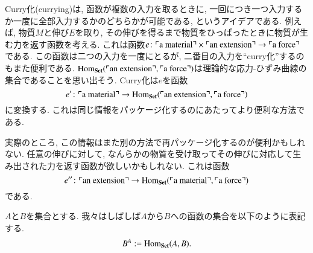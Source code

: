 
Curry化(currying)は, 函数が複数の入力を取るときに, 一回につき一つ入力するか一度に全部入力するかのどちらかが可能である, というアイデアである. 例えば, 物質$M$と伸び$E$を取り, その伸びを得るまで物質をひっぱったときに物質が生む力を返す函数を考える. これは函数$e\colon \textrm{$\ulcorner$a material$\urcorner$}\times\textrm{$\ulcorner$an extension$\urcorner$}\rightarrow\textrm{$\ulcorner$a force$\urcorner$}$である. この函数は二つの入力を一度にとるが, 二番目の入力を``curry化''するのもまた便利である. $\textrm{Hom}_{\bf Set}(\textrm{$\ulcorner$an extension$\urcorner$},\textrm{$\ulcorner$a force$\urcorner$})$は理論的な応力-ひずみ曲線の集合であることを思い出そう. Curry化は$e$を函数$$e'\colon\textrm{$\ulcorner$a material$\urcorner$}\rightarrow\textrm{Hom}_{\bf Set}(\textrm{$\ulcorner$an extension$\urcorner$},\textrm{$\ulcorner$a force$\urcorner$})$$に変換する. これは同じ情報をパッケージ化するのにあたってより便利な方法である.


実際のところ, この情報はまた別の方法で再パッケージ化するのが便利かもしれない. 任意の伸びに対して, なんらかの物質を受け取ってその伸びに対応して生み出された力を返す函数が欲しいかもしれない. これは函数$$e''\colon\textrm{$\ulcorner$an extension$\urcorner$}\rightarrow\textrm{Hom}_{\bf Set}(\textrm{$\ulcorner$a material$\urcorner$},\textrm{$\ulcorner$a force$\urcorner$})$$である.

\begin{notation}
$A$と$B$を集合とする. 我々はしばしば$A$から$B$への函数の集合を以下のように表記する.
\begin{align}\label{dia:exponential sets}
B^A:=\textrm{Hom}_{\bf Set}(A,B).
\end{align}
\end{notation}

